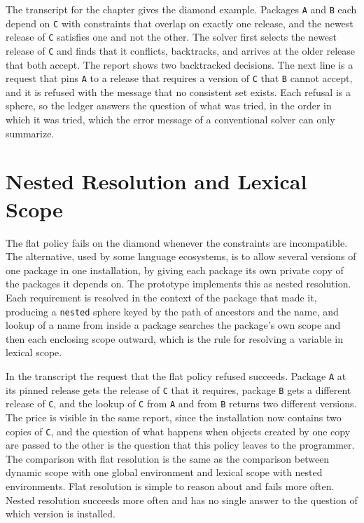 \documentclass[11pt,oneside]{report}
\theoremstyle{plain}
\theoremstyle{definition}
\theoremstyle{remark}
\newcommand{\code}[2][Python]{}
\begin{document}
\code{ex_index_flat}

The transcript for the chapter gives the diamond example. Packages \texttt{A} and \texttt{B} each depend on \texttt{C} with constraints that overlap on exactly one release, and the newest release of \texttt{C} satisfies one and not the other. The solver first selects the newest release of \texttt{C} and finds that it conflicts, backtracks, and arrives at the older release that both accept. The report shows two backtracked decisions. The next line is a request that pins \texttt{A} to a release that requires a version of \texttt{C} that \texttt{B} cannot accept, and it is refused with the message that no consistent set exists. Each refusal is a sphere, so the ledger answers the question of what was tried, in the order in which it was tried, which the error message of a conventional solver can only summarize.

\section{Nested Resolution and Lexical Scope}

The flat policy fails on the diamond whenever the constraints are incompatible. The alternative, used by some language ecosystems, is to allow several versions of one package in one installation, by giving each package its own private copy of the packages it depends on. The prototype implements this as nested resolution. Each requirement is resolved in the context of the package that made it, producing a \texttt{nested} sphere keyed by the path of ancestors and the name, and lookup of a name from inside a package searches the package's own scope and then each enclosing scope outward, which is the rule for resolving a variable in lexical scope.

\code{ex_index_nested}

In the transcript the request that the flat policy refused succeeds. Package \texttt{A} at its pinned release gets the release of \texttt{C} that it requires, package \texttt{B} gets a different release of \texttt{C}, and the lookup of \texttt{C} from \texttt{A} and from \texttt{B} returns two different versions. The price is visible in the same report, since the installation now contains two copies of \texttt{C}, and the question of what happens when objects created by one copy are passed to the other is the question that this policy leaves to the programmer. The comparison with flat resolution is the same as the comparison between dynamic scope with one global environment and lexical scope with nested environments. Flat resolution is simple to reason about and fails more often. Nested resolution succeeds more often and has no single answer to the question of which version is installed.
\end{document}
